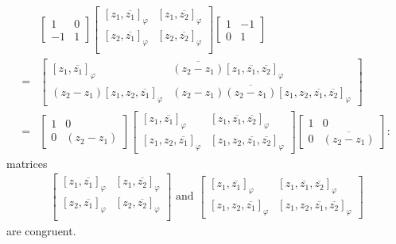 \begin{align*}
&\begin{bmatrix}
	1 & 0 \\
	-1 & 1
\end{bmatrix}
\begin{bmatrix}
	[z_{1}, \overline{z_{1}}]_{\varphi} & [z_{1}, \overline{z_{2}}]_{\varphi}\\
	[z_{2}, \overline{z_{1}}]_{\varphi} & [z_{2}, \overline{z_{2}}]_{\varphi}\\
\end{bmatrix}
\begin{bmatrix}
	1 & -1 \\
	0 & 1
\end{bmatrix} \\
= &
\begin{bmatrix}
	[z_{1}, \overline{z_{1}}]_{\varphi} & \overline{(z_{2} - z_{1})}[z_{1}, \overline{z_{1}}, \overline{z_{2}}]_{\varphi}\\
	(z_{2} - z_{1})[z_{1}, z_{2}, \overline{z_{1}}]_{\varphi} & (z_{2} - z_{1}) \overline{(z_{2} - z_{1})}[z_{1}, z_{2}, \overline{z_{1}}, \overline{z_{2}}]_{\varphi}
\end{bmatrix} \\
= &
\begin{bmatrix}
	1 & 0 \\
	0 & (z_{2} - z_{1})
\end{bmatrix}
\begin{bmatrix}
	[z_{1}, \overline{z_{1}}]_{\varphi} & [z_{1}, \overline{z_{1}}, \overline{z_{2}}]_{\varphi}\\
	[z_{1}, z_{2}, \overline{z_{1}}]_{\varphi} & [z_{1}, z_{2}, \overline{z_{1}}, \overline{z_{2}}]_{\varphi}
\end{bmatrix}
\begin{bmatrix}
	1 & 0 \\
	0 & \overline{(z_{2} - z_{1})}
\end{bmatrix}:
\end{align*}
matrices
\begin{align*}
\begin{bmatrix}
	[z_{1}, \overline{z_{1}}]_{\varphi} & [z_{1}, \overline{z_{2}}]_{\varphi}\\
	[z_{2}, \overline{z_{1}}]_{\varphi} & [z_{2}, \overline{z_{2}}]_{\varphi}\\
\end{bmatrix}
\text{ and }
\begin{bmatrix}
	[z_{1}, \overline{z_{1}}]_{\varphi} & [z_{1}, \overline{z_{1}}, \overline{z_{2}}]_{\varphi}\\
	[z_{1}, z_{2}, \overline{z_{1}}]_{\varphi} & [z_{1}, z_{2}, \overline{z_{1}}, \overline{z_{2}}]_{\varphi}
\end{bmatrix}
\end{align*}
are congruent.

